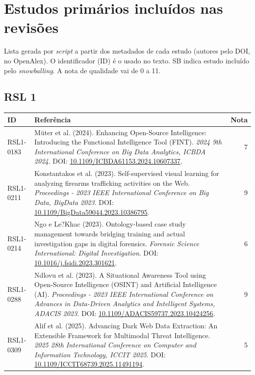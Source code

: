\chapter{Estudos primários incluídos nas revisões}
\label{ap:estudos}

Lista gerada por \textit{script} a partir dos metadados de cada estudo (autores pelo DOI, no OpenAlex). O identificador (ID) é o usado no texto. SB indica estudo incluído pelo \textit{snowballing}. A nota de qualidade vai de 0 a 11.

\section{RSL 1}
\begin{small}
\begin{longtable}{lp{11.2cm}r}
\hline
\textbf{ID} & \textbf{Referência} & \textbf{Nota} \\ \hline\endhead
RSL1-0183 & Müter et al. (2024). Enhancing Open-Source Intelligence: Introducing the Functional Intelligence Tool (FINT). \textit{2024 9th International Conference on Big Data Analytics, ICBDA 2024}. DOI: \url{10.1109/ICBDA61153.2024.10607337}. & 7 \\
RSL1-0211 & Konstantakos et al. (2023). Self-supervised visual learning for analyzing firearms trafficking activities on the Web. \textit{Proceedings - 2023 IEEE International Conference on Big Data, BigData 2023}. DOI: \url{10.1109/BigData59044.2023.10386795}. & 9 \\
RSL1-0214 & Ngo e Le?Khac (2023). Ontology-based case study management towards bridging training and actual investigation gaps in digital forensics. \textit{Forensic Science International: Digital Investigation}. DOI: \url{10.1016/j.fsidi.2023.301621}. & 6 \\
RSL1-0288 & Ndlovu et al. (2023). A Situational Awareness Tool using Open-Source Intelligence (OSINT) and Artificial Intelligence (AI). \textit{Proceedings - 2023 IEEE International Conference on Advances in Data-Driven Analytics and Intelligent Systems, ADACIS 2023}. DOI: \url{10.1109/ADACIS59737.2023.10424256}. & 9 \\
RSL1-0309 & Alif et al. (2025). Advancing Dark Web Data Extraction: An Extensible Framework for Multimodal Threat Intelligence. \textit{2025 28th International Conference on Computer and Information Technology, ICCIT 2025}. DOI: \url{10.1109/ICCIT68739.2025.11491194}. & 5 \\

\end{longtable}
\end{small}
